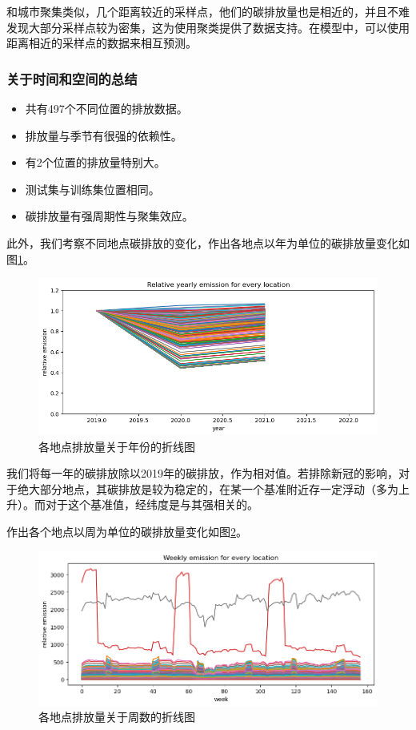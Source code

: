 \documentclass{ctexart}
\begin{document}
和城市聚集类似，几个距离较近的采样点，他们的碳排放量也是相近的，并且不难发现大部分采样点较为密集，这为使用聚类提供了数据支持。在模型中，可以使用距离相近的采样点的数据来相互预测。

\subsubsection{关于时间和空间的总结}

\begin{itemize}
      \item 共有497个不同位置的排放数据。
      \item 排放量与季节有很强的依赖性。
      \item 有2个位置的排放量特别大。
      \item 测试集与训练集位置相同。
      \item 碳排放量有强周期性与聚集效应。
\end{itemize}

此外，我们考察不同地点碳排放的变化，作出各地点以年为单位的碳排放量变化如图\ref{fig:5}。

\begin{figure}[H]
      \centering
      \includegraphics[width=1\textwidth]{output5.png}
      \caption{\label{fig:5}各地点排放量关于年份的折线图}
\end{figure}

我们将每一年的碳排放除以2019年的碳排放，作为相对值。若排除新冠的影响，对于绝大部分地点，其碳排放是较为稳定的，在某一个基准附近存一定浮动（多为上升）。而对于这个基准值，经纬度是与其强相关的。

作出各个地点以周为单位的碳排放量变化如图\ref{fig:8}。

\begin{figure}[H]
      \centering
      \includegraphics[width=1\textwidth]{output8.png}
      \caption{\label{fig:8}各地点排放量关于周数的折线图}
\end{figure}
\end{document}
